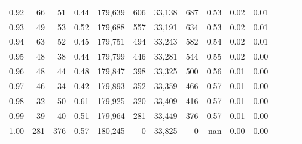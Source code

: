 \begin{tabular}{rrrrrrrrrrrrrr}
0.92 &     66 &   51 &  0.44 &  179,639 &      606 &  33,138 &     687 &  0.53 &  0.02 &      0.01 \\
0.93 &     49 &   53 &  0.52 &  179,688 &      557 &  33,191 &     634 &  0.53 &  0.02 &      0.01 \\
0.94 &     63 &   52 &  0.45 &  179,751 &      494 &  33,243 &     582 &  0.54 &  0.02 &      0.01 \\
0.95 &     48 &   38 &  0.44 &  179,799 &      446 &  33,281 &     544 &  0.55 &  0.02 &      0.00 \\
0.96 &     48 &   44 &  0.48 &  179,847 &      398 &  33,325 &     500 &  0.56 &  0.01 &      0.00 \\
0.97 &     46 &   34 &  0.42 &  179,893 &      352 &  33,359 &     466 &  0.57 &  0.01 &      0.00 \\
0.98 &     32 &   50 &  0.61 &  179,925 &      320 &  33,409 &     416 &  0.57 &  0.01 &      0.00 \\
0.99 &     39 &   40 &  0.51 &  179,964 &      281 &  33,449 &     376 &  0.57 &  0.01 &      0.00 \\
1.00 &    281 &  376 &  0.57 &  180,245 &        0 &  33,825 &       0 &   nan &  0.00 &      0.00 \\
\bottomrule
\end{tabular}
